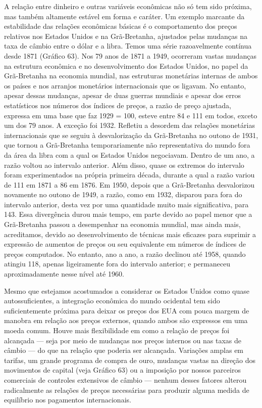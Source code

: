 \documentclass[12pt]{article}
\begin{document}
A relação entre dinheiro e outras variáveis econômicas não só tem sido próxima, mas também altamente estável em forma e caráter. Um exemplo marcante da estabilidade das relações econômicas básicas é o comportamento dos preços relativos nos Estados Unidos e na Grã-Bretanha, ajustados pelas mudanças na taxa de câmbio entre o dólar e a libra. Temos uma série razoavelmente contínua desde 1871 (Gráfico 63). Nos 79 anos de 1871 a 1949, ocorreram vastas mudanças na estrutura econômica e no desenvolvimento dos Estados Unidos, no papel da Grã-Bretanha na economia mundial, nas estruturas monetárias internas de ambos os países e nos arranjos monetários internacionais que os ligavam. No entanto, apesar dessas mudanças, apesar de duas guerras mundiais e apesar dos erros estatísticos nos números dos índices de preços, a razão de preço ajustada, expressa em uma base que faz 1929 = 100, esteve entre 84 e 111 em todos, exceto um dos 79 anos. A exceção foi 1932. Refletiu a desordem das relações monetárias internacionais que se seguiu à desvalorização da Grã-Bretanha no outono de 1931, que tornou a Grã-Bretanha temporariamente não representativa do mundo fora da área da libra com a qual os Estados Unidos negociavam. Dentro de um ano, a razão voltou ao intervalo anterior. Além disso, quase os extremos do intervalo foram experimentados na própria primeira década, durante a qual a razão variou de 111 em 1871 a 86 em 1876. Em 1950, depois que a Grã-Bretanha desvalorizou novamente no outono de 1949, a razão, como em 1932, disparou para fora do intervalo anterior, desta vez por uma quantidade muito mais significativa, para 143. Essa divergência durou mais tempo, em parte devido ao papel menor que a Grã-Bretanha passou a desempenhar na economia mundial, mas ainda mais, acreditamos, devido ao desenvolvimento de técnicas mais eficazes para suprimir a expressão de aumentos de preços ou seu equivalente em números de índices de preços computados. No entanto, ano a ano, a razão declinou até 1958, quando atingiu 118, apenas ligeiramente fora do intervalo anterior; e permaneceu aproximadamente nesse nível até 1960.

Mesmo que estejamos acostumados a considerar os Estados Unidos como quase autossuficientes, a integração econômica do mundo ocidental tem sido suficientemente próxima para deixar os preços dos EUA com pouca margem de manobra em relação aos preços externos, quando ambos são expressos em uma moeda comum. Houve mais flexibilidade em como a relação de preços foi alcançada — seja por meio de mudanças nos preços internos ou nas taxas de câmbio — do que na relação que poderia ser alcançada. Variações amplas em tarifas, um grande programa de compra de ouro, mudanças vastas na direção dos movimentos de capital (veja Gráfico 63) ou a imposição por nossos parceiros comerciais de controles extensivos de câmbio — nenhum desses fatores alterou radicalmente as relações de preços necessárias para produzir alguma medida de equilíbrio nos pagamentos internacionais.
\end{document}
